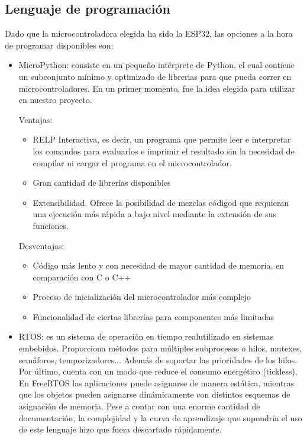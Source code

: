 \documentclass[runningheads]{llncs}
\begin{document}
\subsection*{Lenguaje de programación}

Dado que la microcontroladora elegida ha sido la ESP32, las opciones a la hora 
de programar disponibles son:

\begin{itemize}
    \item MicroPython: consiste en un pequeño intérprete de Python, el cual 
    contiene un subconjunto mínimo y optimizado de librerias para que pueda 
    correr en microcontroladores.
    En un primer momento, fue la idea elegida para utilizar en nuestro proyecto.
    
    Ventajas:
    \begin{itemize}
        \item RELP Interactiva, es decir, un programa que permite leer e 
        interpretar los comandos para evaluarlos e imprimir el resultado sin la 
        necesidad de compilar ni cargar el programa en el microcontrolador.
        \item Gran cantidad de librerías disponibles
        \item Extensibilidad. Ofrece la posibilidad de mezclas códigod que 
        requieran una ejecución más rápida a bajo nivel mediante la extensión de
        sus funciones.
    \end{itemize}
    
    Desventajas:
    \begin{itemize}
        \item Código más lento y con necesidad de mayor cantidad de memoria, en 
        comparación con C o C++
        \item Proceso de inicialización del microcontrolador más complejo
        \item Funcionalidad de ciertas librerías para componentes más limitadas
    \end{itemize}
     
    \item RTOS: es un sistema de operación en tiempo realutilizado en sistemas 
    embebidos. Proporciona métodos para múltiples subprocesos o hilos, mutexes, 
    semáforos, temporizadores... Además de soportar las prioridades de los 
    hilos. Por último, cuenta con un modo que reduce el consumo energético 
    (tickless). En FreeRTOS las aplicaciones puede asignarse de manera estática,
    mientras que los objetos pueden asignarse dinámicamente con distintos 
    esquemas de asignación de memoria. 
    Pese a contar con una enorme cantidad de documentación, la complejidad y la 
    curva de aprendizaje que supondría el uso de este lenguaje hizo que fuera 
    descartado rápidamente.
    

\end{itemize}
\end{document}
